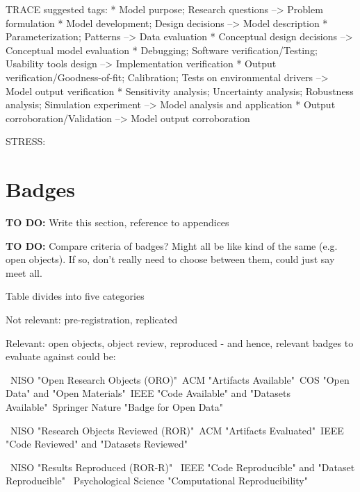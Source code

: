 TRACE suggested tags:
* Model purpose; Research questions --> Problem formulation
* Model development; Design decisions --> Model description
* Parameterization; Patterns --> Data evaluation
* Conceptual design decisions --> Conceptual model evaluation
* Debugging; Software verification/Testing; Usability tools design --> Implementation verification
* Output verification/Goodness-of-fit; Calibration; Tests on environmental drivers --> Model output verification
* Sensitivity analysis; Uncertainty analysis; Robustness analysis; Simulation experiment --> Model analysis and application
* Output corroboration/Validation --> Model output corroboration

STRESS:

\section{Badges}

\textbf{TO DO:} Write this section, reference to appendices

\textbf{TO DO:} Compare criteria of badges? Might all be like kind of the same (e.g. open objects). If so, don't really need to choose between them, could just say meet all.

Table divides into five categories

Not relevant: pre-registration, replicated

Relevant: open objects, object review, reproduced - and hence, relevant badges to evaluate against could be:

\textbullet\ NISO "Open Research Objects (ORO)"\newline \textbullet\ ACM "Artifacts Available"\newline \textbullet\ COS "Open Data" and "Open Materials"\newline \textbullet\ IEEE "Code Available" and "Datasets Available"\newline \textbullet\ Springer Nature "Badge for Open Data"

\textbullet\ NISO "Research Objects Reviewed (ROR)"\newline \textbullet\ ACM "Artifacts Evaluated"\newline \textbullet\ IEEE "Code Reviewed" and "Datasets Reviewed"

\textbullet\ NISO "Results Reproduced (ROR-R)" \newline \textbullet\ IEEE "Code Reproducible" and "Dataset Reproducible" \newline \textbullet\ Psychological Science "Computational Reproducibility"
            
